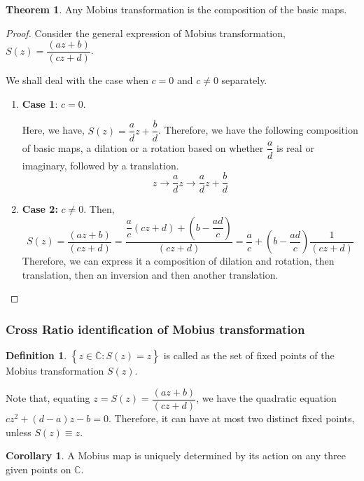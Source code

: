 \documentclass[12pt]{article}
\newcommand{\C}{\mathbb{C}}
\newcommand{\Cinf}{\overline{\C}}
\theoremstyle{definition}
\newtheorem{thm}{Theorem}
\newtheorem{cor}{Corollary}
\newtheorem{defn}{Definition}
\newenvironment{definition}{
\begin{tcolorbox}[colback=green!5!white,colframe=green!75!black, parbox = false]\begin{defn} }{\end{defn}\end{tcolorbox} }
\newenvironment{theorem}{
\begin{tcolorbox}[colback=green!5!white,colframe=green!75!black, parbox = false]\begin{thm} }{\end{thm}\end{tcolorbox} }
\newenvironment{corollary}{
\begin{tcolorbox}[colback=blue!5!white,colframe=blue!75!black, parbox = false]\begin{cor} }{\end{cor}\end{tcolorbox} }
\begin{document}
\begin{theorem}
    Any Mobius transformation is the composition of the basic maps.
\end{theorem}
\begin{proof}
    Consider the general expression of Mobius transformation, $S(z) = \dfrac{(az + b)}{(cz + d)}$.
    
    We shall deal with the case when $c = 0$ and $c \neq 0$ separately.
    
    \begin{enumerate}
        \item \textbf{Case 1}: $c = 0$.
        
        Here, we have, $S(z) = \dfrac{a}{d}z + \dfrac{b}{d}$.
        Therefore, we have the following composition of basic maps, a dilation or a rotation based on whether $\dfrac{a}{d}$ is real or imaginary, followed by a translation.
        $$z \rightarrow \dfrac{a}{d}z \rightarrow \dfrac{a}{d}z + \dfrac{b}{d}$$
        
        \item \textbf{Case 2:} $c \neq 0$.
        Then, 
        $$S(z) = \dfrac{(az + b)}{(cz + d)} = \dfrac{\dfrac{a}{c}(cz + d) + \left(b - \dfrac{ad}{c} \right)}{(cz + d)} = \dfrac{a}{c} + \left(b - \dfrac{ad}{c} \right) \dfrac{1}{(cz + d)}$$
        Therefore, we can express it a composition of dilation and rotation, then translation, then an inversion and then another translation.
    \end{enumerate}
\end{proof}

\subsubsection{Cross Ratio identification of Mobius transformation}
\begin{definition}
    $\left\{ z \in \Cinf : S(z) = z \right\}$ is called as the set of fixed points of the Mobius transformation $S(z)$.
\end{definition}

Note that, equating $z = S(z) = \dfrac{(az + b)}{(cz +d)}$, we have the quadratic equation $cz^2 + (d-a)z - b = 0$. Therefore, it can have at most two distinct fixed points, unless $S(z) \equiv z$.

\begin{corollary}
    A Mobius map is uniquely determined by its action on any three given points on $\C$.
\end{corollary}
\end{document}
